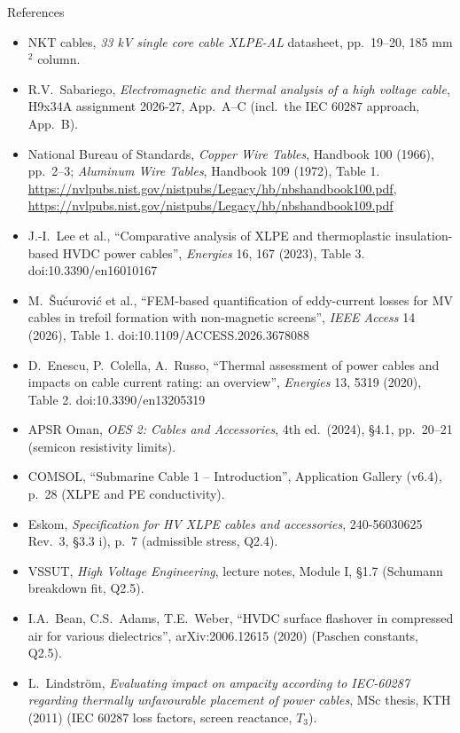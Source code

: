 \documentclass[aspectratio=169,10pt]{beamer}
\begin{document}
\begin{frame}{References}
\scriptsize
\begin{itemize}\setlength{\itemsep}{1pt}
\item[{[NKT]}] NKT cables, \emph{33 kV single core cable XLPE-AL} datasheet, pp.~19--20, 185 mm$^2$ column.
\item[{[Course]}] R.V.~Sabariego, \emph{Electromagnetic and thermal analysis of a high voltage cable}, H9x34A assignment 2026-27, App.~A--C (incl.\ the IEC 60287 approach, App.~B).
\item[{[NBS]}] National Bureau of Standards, \emph{Copper Wire Tables}, Handbook 100 (1966), pp.~2--3; \emph{Aluminum Wire Tables}, Handbook 109 (1972), Table 1.
  \url{https://nvlpubs.nist.gov/nistpubs/Legacy/hb/nbshandbook100.pdf}, \url{https://nvlpubs.nist.gov/nistpubs/Legacy/hb/nbshandbook109.pdf}
\item[{[Lee]}] J.-I.~Lee et al., ``Comparative analysis of XLPE and thermoplastic insulation-based HVDC power cables'', \emph{Energies} 16, 167 (2023), Table 3. doi:10.3390/en16010167
\item[{[\v{S}u\'{c}urovi\'{c}]}] M.~\v{S}u\'{c}urovi\'{c} et al., ``FEM-based quantification of eddy-current losses for MV cables in trefoil formation with non-magnetic screens'', \emph{IEEE Access} 14 (2026), Table 1. doi:10.1109/ACCESS.2026.3678088
\item[{[Enescu]}] D.~Enescu, P.~Colella, A.~Russo, ``Thermal assessment of power cables and impacts on cable current rating: an overview'', \emph{Energies} 13, 5319 (2020), Table 2. doi:10.3390/en13205319
\item[{[OES]}] APSR Oman, \emph{OES 2: Cables and Accessories}, 4th ed.\ (2024), \S4.1, pp.~20--21 (semicon resistivity limits).
\item[{[COMSOL]}] COMSOL, ``Submarine Cable 1 -- Introduction'', Application Gallery (v6.4), p.~28 (XLPE and PE conductivity).
\item[{[Eskom]}] Eskom, \emph{Specification for HV XLPE cables and accessories}, 240-56030625 Rev.~3, \S3.3 i), p.~7 (admissible stress, Q2.4).
\item[{[VSSUT]}] VSSUT, \emph{High Voltage Engineering}, lecture notes, Module I, \S1.7 (Schumann breakdown fit, Q2.5).
\item[{[Bean]}] I.A.~Bean, C.S.~Adams, T.E.~Weber, ``HVDC surface flashover in compressed air for various dielectrics'', arXiv:2006.12615 (2020) (Paschen constants, Q2.5).
\item[{[KTH]}] L.~Lindstr\"om, \emph{Evaluating impact on ampacity according to IEC-60287 regarding thermally unfavourable placement of power cables}, MSc thesis, KTH (2011) (IEC 60287 loss factors, screen reactance, $T_3$).
\end{itemize}
\end{frame}
\end{document}
